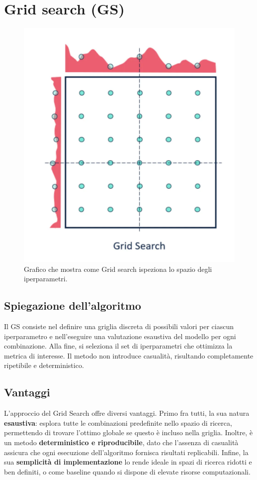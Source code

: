 \documentclass[a4paper,12pt]{report}
\begin{document}
	\section{Grid search (GS)}
	\begin{figure}[H]
		\centering
		\includegraphics[width=1.0\textwidth]{img/gs.png}
		\caption{Grafico che mostra come Grid search ispeziona lo spazio degli iperparametri.}
	\end{figure}
	\subsection{Spiegazione dell'algoritmo}
	Il GS consiste nel definire una griglia discreta di possibili valori per ciascun iperparametro e nell'eseguire una valutazione esaustiva del modello per ogni combinazione. Alla fine, si seleziona il set di iperparametri che ottimizza la metrica di interesse. Il metodo non introduce casualità, risultando completamente ripetibile e deterministico.
	
	\subsection{Vantaggi}
	L'approccio del Grid Search offre diversi vantaggi. Primo fra tutti, la sua natura \textbf{esaustiva}: esplora tutte le combinazioni predefinite nello spazio di ricerca, permettendo di trovare l'ottimo globale se questo è incluso nella griglia. Inoltre, è un metodo \textbf{deterministico e riproducibile}, dato che l'assenza di casualità assicura che ogni esecuzione dell'algoritmo fornisca risultati replicabili. Infine, la sua \textbf{semplicità di implementazione} lo rende ideale in spazi di ricerca ridotti e ben definiti, o come baseline quando si dispone di elevate risorse computazionali.
	
\end{document}
